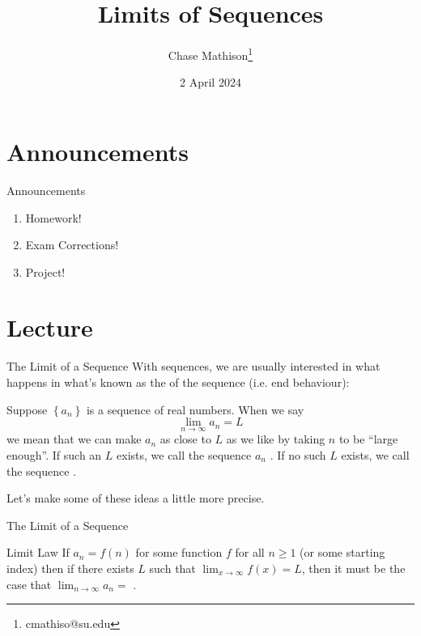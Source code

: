 \documentclass[presentation]{beamer}
\institute[SU]{Shenandoah University}
\author{Chase Mathison\thanks{cmathiso@su.edu}}
\date{2 April 2024}
\title{Limits of Sequences}
\begin{document}
\maketitle

\section{Announcements}
\label{sec:org1e4e1d3}
\begin{frame}[label={sec:org71ffac0}]{Announcements}
\begin{enumerate}
\item Homework!
\item Exam Corrections!
\item Project!
\end{enumerate}
\end{frame}

\section{Lecture}
\label{sec:org81e4bde}
\begin{frame}[label={sec:org50efd67}]{The Limit of a Sequence}
With sequences, we are usually interested in what happens in what's
known as the \uline{\hspace*{1in}} of the sequence (i.e. end behaviour):

\begin{definition}
Suppose \(\left\{ a_n \right\}\) is a sequence of real numbers.  When
we say
\[
\lim_{n\rightarrow \infty} a_n = L\]
we mean that we can make \(a_n\) as close to \(L\) as we like by taking
\(n\) to be ``large enough''.  If such an \(L\) exists, we call the sequence
\(a_n\) \uline{\hspace*{1in}}.  If no such \(L\) exists, we call the sequence \uline{\hspace*{1in}}.
\end{definition}

Let's make some of these ideas a little more precise.
\end{frame}

\begin{frame}[label={sec:orgf2a1f97}]{The Limit of a Sequence}
\end{frame}

\begin{frame}[label={sec:org835f1bd}]{Limit Law}
If \(a_n = f(n)\) for some function \(f\) for all \(n \ge 1\) (or some
starting index) then if there exists \(L\) such that
\(\lim_{x\rightarrow \infty} f(x) = L\), then it must be the case that
\(\lim_{n\rightarrow \infty} a_n =\) \uline{\hspace*{1in}}.

\vspace{1in}
\end{frame}
\end{document}
